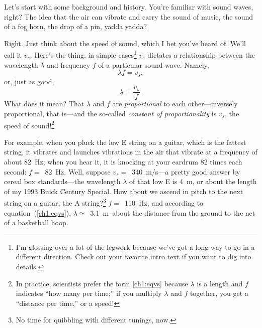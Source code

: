 






Let's start with some background and history. You're familiar with
sound waves, right? The idea that the air can vibrate and carry the
sound of music, the sound of a fog horn, the drop of a pin, yadda
yadda? 

Right. Just think about the speed of sound, which I bet you've heard
of. We'll call it $v_s$. Here's the thing: in simple
cases\footnote{I'm glossing over a lot of the legwork because we've
  got a long way to go in a different direction. Check out your
  favorite intro text if you want to dig into details.}  $v_s$
dictates a relationship between the wavelength $\lambda$ and frequency
$f$ of a particular sound wave. Namely,
\begin{equation}
  \label{ch1:eqvs}
  \lambda f = v_s,
\end{equation}
or, just as good,
\begin{equation}
  \label{ch1:eqvsdiff}
  \lambda = \dfrac{v_s}{f}.
\end{equation}
What does it mean? That $\lambda$ and $f$ are \emph{proportional} to
each other---inversely proportional, that is---and the so-called
\emph{constant of proportionality} is $v_s$, the speed of
sound!\footnote{In practice, scientists prefer the form \ref{ch1:eqvs}
  because $\lambda$ is a length and $f$ indicates ``how many per
  time;'' if you multiply $\lambda$ and $f$ together, you get a
  ``distance per time,'' or a speed!}

For example, when you pluck the low E string on a guitar, which is the
fattest string, it vibrates and launches vibrations in the air that
vibrate at a frequency of about 82~Hz; when you hear it, it is
knocking at your eardrum 82 times each second: $f = $~82~Hz. Well,
suppose $v_s =$~340~m/s---a pretty good answer by cereal box
standards---the wavelength $\lambda$ of that low E is 4~m, or about
the length of my 1993 Buick Century Special. How about we ascend in
pitch to the next string on a guitar, the A string?\footnote{No time
  for quibbling with different tunings, now.}  $f = $~110~Hz, and
according to equation~(\ref{ch1:eqvs}), $\lambda \simeq$~3.1~m--about
the distance from the ground to the net of a basketball hoop. 

